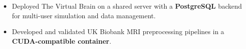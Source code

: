 \entrygap
{}
\begin{itemize}
  \item Deployed The Virtual Brain on a shared server with a \textbf{PostgreSQL} backend for multi-user simulation and data management.
  \item Developed and validated UK Biobank MRI preprocessing pipelines in a \textbf{CUDA-compatible container}.
\end{itemize}

